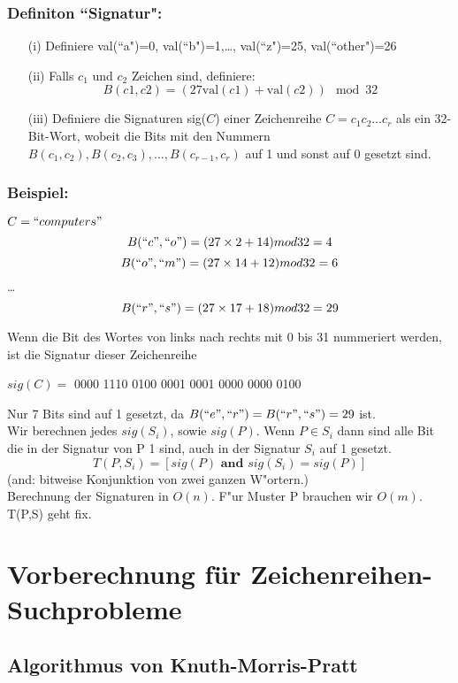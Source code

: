 \documentclass[a4paper]{scrartcl}
\begin{document}
 \subsubsection*{Definiton ``Signatur":} 
 \begin{itemize}
 	\item[(i)] Definiere val(``a")=0, val(``b")=1,\dots, val(``z")=25, val(``other")=26
 	\item[(ii)] Falls $c_1$ und $c_2$ Zeichen sind, definiere: 
 			$$B(c1,c2)=(27\text{val}(c1)+\text{val}(c2)) \mod 32$$
    \item[(iii)] Definiere die Signaturen sig($C$) einer Zeichenreihe  $C=c_1 c_2 \dots c_r$ als ein 32-Bit-Wort, wobeit die Bits mit den Nummern $B(c_1,c_2),B(c_2,c_3),\dots,B(c_{r-1},c_r)$ auf 1 und sonst auf 0 gesetzt sind.
 \end{itemize}
\subsubsection*{Beispiel:}
 $C=``computers"$\\
        $$B(``c",``o")=(27\times 2 + 14) mod 32 = 4$$
        $$B(``o",``m")=(27\times 14+ 12) mod 32 = 6$$
        \dots
        $$B(``r",``s")=(27\times 17+ 18) mod 32 = 29$$
        
        Wenn die Bit des Wortes von links nach rechts mit 0 bis 31 nummeriert werden, ist die Signatur dieser Zeichenreihe
        \begin{center} $sig(C) =$ 0000 1110 0100 0001 0001 0000 0000 0100 \end{center}
 		Nur 7 Bits sind auf 1 gesetzt, da $B(``e",``r")=B(``r",``s")=29$ ist.\\
 		Wir berechnen jedes $sig(S_i)$, sowie $sig(P)$. Wenn $P\in S_i$ dann sind alle Bit die in der Signatur von P 1 sind, auch in der Signatur $S_i$ auf 1 gesetzt.\\
 		$$T(P,S_i)=[sig(P)\textbf{ and }sig(S_i)=sig(P)]$$
 		(and:  bitweise Konjunktion von zwei ganzen W"ortern.)\\
 		Berechnung der Signaturen in $O(n)$. F"ur Muster P brauchen wir $O(m)$. T(P,S) geht fix.

\section{Vorberechnung für Zeichenreihen-Suchprobleme}

\subsection{Algorithmus von Knuth-Morris-Pratt}
\end{document}
